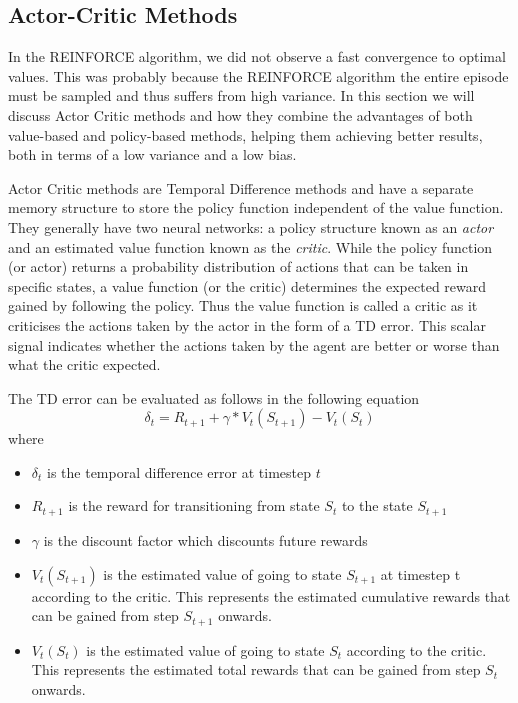 \documentclass{article}
\begin{document}
  

\subsection{Actor-Critic Methods}
\par In the REINFORCE algorithm, we did not observe a fast convergence to optimal values. This was probably because the REINFORCE algorithm the entire episode must be sampled and thus suffers from high variance. In this section we will discuss Actor Critic methods and how they combine the advantages of both value-based and policy-based methods, helping them achieving better results, both in terms of a low variance and a low bias. 
\par Actor Critic methods are Temporal Difference methods and have a separate memory structure to store the policy function independent of the value function. They generally have two neural networks: a policy structure known as an \emph{actor} and an estimated value function known as the \emph{critic}. While the policy function (or actor) returns a probability distribution of actions that can be taken in specific states, a value function (or the critic) determines the expected reward gained by following the policy. Thus the value function is called a critic as it criticises the actions taken by the actor in the form of a TD error. This scalar signal indicates whether the actions taken by the agent are better or worse than what the critic expected. 
\par The TD error can be evaluated as follows in the following equation
\begin{equation*}
\delta_{t} = R_{t+1} + \gamma * V_t(S_{t+1})-V_t(S_t)
\end{equation*}
 where 
\begin{itemize}[itemsep=0pt]
\renewcommand\labelitemi{.}
\item $\delta_{t}$ is the temporal difference error at timestep $t$
\item $R_{t+1}$ is the reward for transitioning from state $S_t$ to the state $S_{t+1}$
\item $\gamma$ is the discount factor which discounts future rewards
\item $V_t(S_{t+1})$ is the estimated value of going to state $S_{t+1}$ at timestep t according to the critic. This represents the estimated cumulative rewards that can be gained from step $S_{t+1}$ onwards.
\item $V_t(S_t)$ is the estimated value of going to state $S_t$ according to the critic. This represents the estimated total rewards that can be gained from step $S_{t}$ onwards.
\end{itemize}
\end{document}
